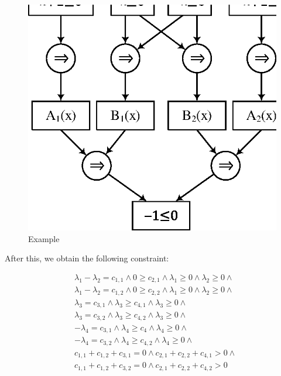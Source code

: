 \begin{figure}
  \begin{center}
    \includegraphics[scale=1]{figures/ex3-3.eps}
  \end{center}
  \caption{Example}
\end{figure}

After this, we obtain the following constraint:

\begin{align*}
& \lambda_1 - \lambda_2 = c_{1,1} \wedge 0 \geq c_{2,1} \wedge \lambda_1 \geq 0 \wedge \lambda_2 \geq 0 \wedge \\
& \lambda_1 - \lambda_2 = c_{1,2} \wedge 0 \geq c_{2,2} \wedge \lambda_1 \geq 0 \wedge \lambda_2 \geq 0 \wedge \\
& \lambda_3 = c_{3,1} \wedge \lambda_3 \geq c_{4,1} \wedge \lambda_3 \geq 0 \wedge \\
& \lambda_3 = c_{3,2} \wedge \lambda_3 \geq c_{4,2} \wedge \lambda_3 \geq 0 \wedge \\
& - \lambda_4 = c_{3,1} \wedge \lambda_4 \geq c_4 \wedge \lambda_4 \geq 0 \wedge \\
& - \lambda_4 = c_{3,2} \wedge \lambda_4 \geq c_{4,2} \wedge \lambda_4 \geq 0 \wedge \\
& c_{1,1} + c_{1,2} + c_{3,1} = 0 \wedge c_{2,1} + c_{2,2} + c_{4,1} > 0 \wedge \\
& c_{1,1} + c_{1,2} + c_{3,2} = 0 \wedge c_{2,1} + c_{2,2} + c_{4,2} > 0
\end{align*}

